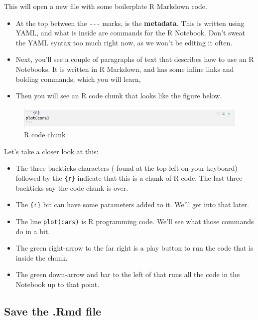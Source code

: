 \documentclass[]{book}
\providecommand{\tightlist}{%
  \setlength{\itemsep}{0pt}\setlength{\parskip}{0pt}}
\begin{document}
This will open a new file with some boilerplate R Markdown code.

\begin{itemize}
\tightlist
\item
  At the top between the \texttt{-\/-\/-} marks, is the
  \textbf{metadata}. This is written using YAML, and what is inside are
  commands for the R Notebook. Don't sweat the YAML syntax too much
  right now, as we won't be editing it often.
\item
  Next, you'll see a couple of paragraphs of text that describes how to
  use an R Notebooks. It is written in R Markdown, and has some inline
  links and bolding commands, which you will learn,
\item
  Then you will see an R code chunk that looks like the figure below.
\end{itemize}

\begin{figure}
\centering
\includegraphics[width=6.25000in]{images/intro-rcodechunk.png}
\caption{R code chunk}
\end{figure}

Let's take a closer look at this:

\begin{itemize}
\tightlist
\item
  The three backticks characters ( found at the top left on your
  keyboard) followed by the \texttt{\{r\}} indicate that this is a chunk
  of R code. The last three backticks say the code chunk is over.
\item
  The \texttt{\{r\}} bit can have some parameters added to it. We'll get
  into that later.
\item
  The line \texttt{plot(cars)} is R programming code. We'll see what
  those commands do in a bit.
\item
  The green right-arrow to the far right is a play button to run the
  code that is inside the chunk.
\item
  The green down-arrow and bar to the left of that runs all the code in
  the Notebook up to that point.
\end{itemize}

\subsection{Save the .Rmd file}\label{save-the-.rmd-file}
\end{document}
